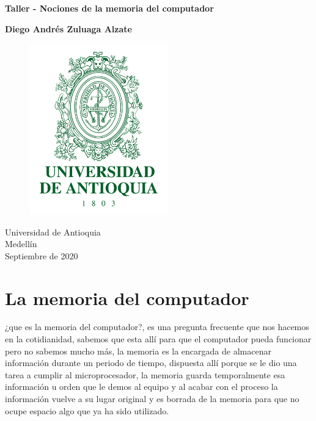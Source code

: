 \documentclass{article}
\begin{document}
\begin{titlepage}
    \begin{center}
        \vspace*{1cm}
            
        \Huge
        \textbf{Taller - Nociones de la memoria del computador}
            
        \vspace{1.5cm}
        
        \textbf{Diego Andrés Zuluaga Alzate}
        
        \vspace{1.5cm}
        
        \begin{figure}[h]
        \includegraphics[width=6cm]{logoudea.png}
        \centering
        \label{fig:logoudea}
        \end{figure}
            
        \vspace{0.7cm}
            
        \Large
        Universidad de Antioquia\\
        Medellín\\
        Septiembre de 2020
            
    \end{center}
\end{titlepage}

\tableofcontents

\break

\section{La memoria del computador}
¿que es la memoria del computador?, es una pregunta frecuente que nos hacemos en la cotidianidad, sabemos que esta allí para que el computador pueda funcionar pero no sabemos mucho más, la memoria es la encargada de almacenar información durante un periodo de tiempo, dispuesta allí porque se le dio una tarea a cumplir al microprocesador, la memoria guarda temporalmente esa información u orden que le demos al equipo y al acabar con el proceso  la información vuelve a su lugar original  y es borrada de la memoria para que no ocupe espacio algo que ya ha sido utilizado.\cite{memoria}
 
\end{document}
